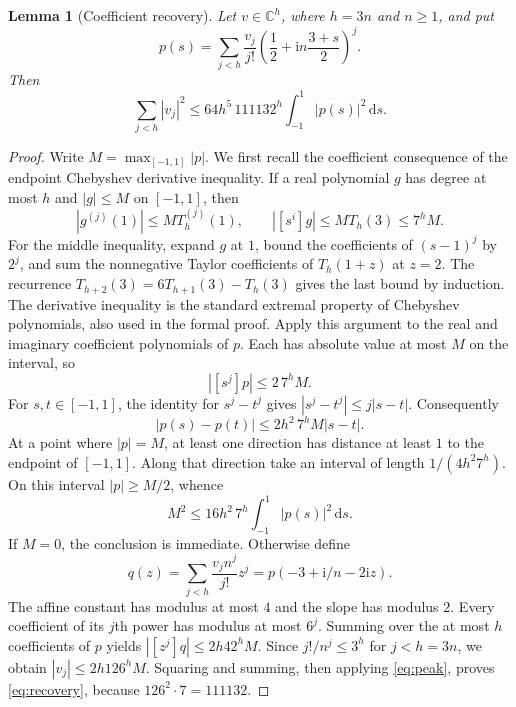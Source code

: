 \documentclass[11pt]{article}
\newtheorem{lemma}[theorem]{Lemma}
\numberwithin{equation}{section}
\newcommand{\C}{\mathbb C}
\newcommand{\ii}{\mathrm i}
\newcommand{\dd}{\,\mathrm d}
\begin{document}
\begin{lemma}[Coefficient recovery]\label{lem:recovery}
Let $v\in\C^h$, where $h=3n$ and $n\geq1$, and put
\[
 p(s)=\sum_{j<h}\frac{v_j}{j!}
                  \left(\frac12+\ii n\frac{3+s}{2}\right)^j.
\]
Then
\begin{equation}\label{eq:recovery}
 \sum_{j<h}|v_j|^2\leq64h^5\,111132^h
                             \int_{-1}^1|p(s)|^2\dd s.
\end{equation}
\end{lemma}
\begin{proof}
Write $M=\max_{[-1,1]}|p|$. We first recall the coefficient consequence
of the endpoint Chebyshev derivative inequality. If a real polynomial
$g$ has degree at most $h$ and $|g|\leq M$ on $[-1,1]$, then
\[
 |g^{(j)}(1)|\leq M T_h^{(j)}(1),
 \qquad |[s^i]g|\leq M T_h(3)\leq7^hM.
\]
For the middle inequality, expand $g$ at $1$, bound the coefficients of
$(s-1)^j$ by $2^j$, and sum the nonnegative Taylor coefficients of
$T_h(1+z)$ at $z=2$. The recurrence
$T_{h+2}(3)=6T_{h+1}(3)-T_h(3)$ gives the last bound by induction.
The derivative inequality is the standard extremal property of
Chebyshev polynomials, also used in the formal proof.
Apply this argument to the real and imaginary coefficient polynomials
of $p$. Each has absolute value at most $M$ on the interval, so
\[
                            |[s^j]p|\leq2\,7^hM.
\]
For $s,t\in[-1,1]$, the identity for $s^j-t^j$ gives
$|s^j-t^j|\leq j|s-t|$. Consequently
\[
                      |p(s)-p(t)|\leq2h^2\,7^hM|s-t|.
\]
At a point where $|p|=M$, at least one direction has distance at least
$1$ to the endpoint of $[-1,1]$. Along that direction take an interval
of length $1/(4h^2 7^h)$. On this interval $|p|\geq M/2$, whence
\begin{equation}\label{eq:peak}
                    M^2\leq16h^2\,7^h\int_{-1}^1|p(s)|^2\dd s.
\end{equation}
If $M=0$, the conclusion is immediate. Otherwise define
\[
 q(z)=\sum_{j<h}\frac{v_jn^j}{j!}z^j
                      =p(-3+\ii/n-2\ii z).
\]
The affine constant has modulus at most $4$ and the slope has modulus
$2$. Every coefficient of its $j$th power has modulus at most $6^j$.
Summing over the at most $h$ coefficients of $p$ yields
$|[z^j]q|\leq2h42^hM$.
Since $j!/n^j\leq3^h$ for $j<h=3n$, we obtain
$|v_j|\leq2h126^hM$. Squaring and summing, then applying
\eqref{eq:peak}, proves \eqref{eq:recovery}, because
$126^2\cdot7=111132$.
\end{proof}
\end{document}

